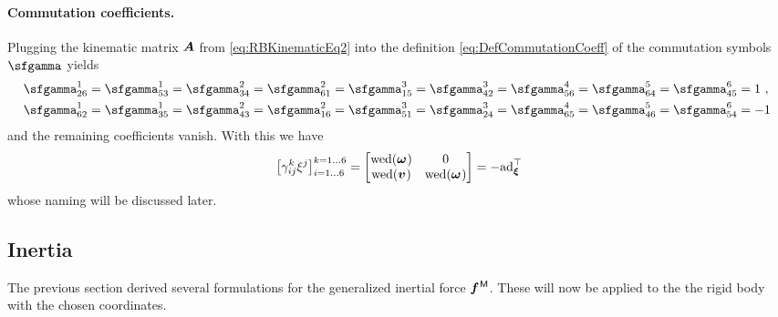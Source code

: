 \paragraph*{Commutation coefficients.}
Plugging the kinematic matrix $\boldsymbol{A}$ from \eqref{eq:RBKinematicEq2} into the definition \eqref{eq:DefCommutationCoeff} of the commutation symbols $\bodyBoltzSym{}{}{}$ yields
\begin{align}\label{eq:RBCommutationCoeff}
 \bodyBoltzSym{1}{2}{6} = \bodyBoltzSym{1}{5}{3} = 
 \bodyBoltzSym{2}{3}{4} = \bodyBoltzSym{2}{6}{1} =
 \bodyBoltzSym{3}{1}{5} = \bodyBoltzSym{3}{4}{2} =
 \bodyBoltzSym{4}{5}{6} =
 \bodyBoltzSym{5}{6}{4} = 
 \bodyBoltzSym{6}{4}{5} &= 1 \ ,
\nonumber\\
 \bodyBoltzSym{1}{6}{2} = \bodyBoltzSym{1}{3}{5} = 
 \bodyBoltzSym{2}{4}{3} = \bodyBoltzSym{2}{1}{6} =
 \bodyBoltzSym{3}{5}{1} = \bodyBoltzSym{3}{2}{4} =
 \bodyBoltzSym{4}{6}{5} =
 \bodyBoltzSym{5}{4}{6} = 
 \bodyBoltzSym{6}{5}{4} &= -1 \ 
\end{align}
and the remaining coefficients vanish.
With this we have
\begin{align}\label{eq:RBCommutationCoeffAd}
 \big[ \BoltzSym{\LidxIII}{\LidxI}{\LidxII} \sysVelCoeff{\LidxII} \big]^{\LidxIII=1\ldots6}_{\LidxI=1\ldots6} =
 \begin{bmatrix} \wedOp(\bodyAngVel{}{}) & 0 \\ \wedOp(\bodyLinVel{}{}) & \wedOp(\bodyAngVel{}{}) \end{bmatrix}
 = -\ad{\sysVel}^\top
\end{align}
whose naming will be discussed later.


\subsection{Inertia}
The previous section derived several formulations for the generalized inertial force $\bodyGenForceInertia{}{}$.
These will now be applied to the the rigid body with the chosen coordinates.

